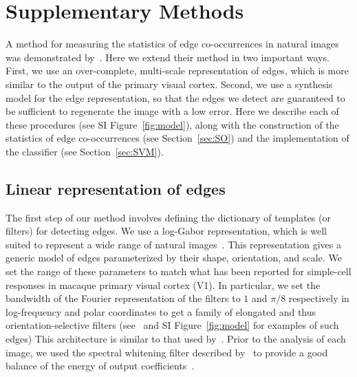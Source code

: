 \documentclass[a4paper]{article}
\begin{document}
\section{Supplementary Methods}
%
A method for measuring the statistics of edge co-occurrences 
in natural images was demonstrated by~\textcite{Geisler01}. 
Here we extend their method in two important ways. 
First, we use an over-complete, multi-scale representation of edges, 
which is more similar to the output of the primary visual cortex. 
Second, we use a synthesis model for the edge representation, 
so that the edges we detect are guaranteed to be sufficient to regenerate the image with a low error. 
Here we describe each of these procedures (see SI Figure~\ref{fig:model}), 
along with the construction of the statistics of edge co-occurrences (see Section~\ref{sec:SO})
and the implementation of the classifier (see Section~\ref{sec:SVM}).

\subsection{Linear representation of edges}
The first step of our method involves defining the dictionary of templates (or
filters) for detecting edges. 
We use a log-Gabor representation, which is well suited to represent 
a wide range of natural images~\autocite{Fischer07}. 
This representation gives a generic model of edges parameterized by their shape,
orientation, and scale.  We set the range of these parameters to match what has been reported 
for simple-cell responses in macaque primary visual cortex (V1). 
In particular, we set the bandwidth of the Fourier representation of the filters 
to $1$ and $\pi/8$ respectively in log-frequency and polar coordinates 
to get a family of elongated and thus orientation-selective filters 
(see~\textcite{Fischer07cv} and SI Figure~\ref{fig:model} for examples of such edges)
This architecture is similar to that used by~\textcite{Geisler01}. 
Prior to the analysis of each image, we used the spectral whitening filter 
described by~\textcite{Olshausen97} to provide 
a good balance of the energy of output coefficients~\autocite{Perrinet03ieee,Fischer07}.
\end{document}

